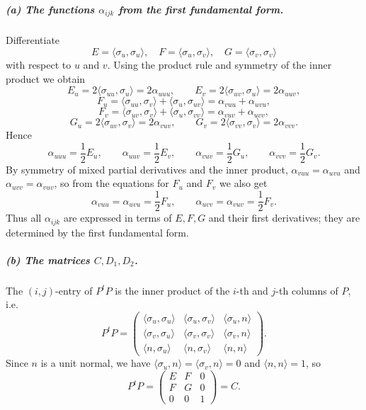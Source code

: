\documentclass[12pt,a4paper]{article}
\theoremstyle{plain}
\theoremstyle{definition}      %
\begin{document}
	\subparagraph{(a) The functions $\alpha_{ijk}$ from the first fundamental form.}
	Differentiate
	\[
	E=\langle\sigma_u,\sigma_u\rangle,\quad
	F=\langle\sigma_u,\sigma_v\rangle,\quad
	G=\langle\sigma_v,\sigma_v\rangle
	\]
	with respect to $u$ and $v$.  Using the product rule and symmetry of the inner
	product we obtain
	\[
	E_u = 2\langle\sigma_{uu},\sigma_u\rangle = 2\alpha_{uuu},\qquad
	E_v = 2\langle\sigma_{uv},\sigma_u\rangle = 2\alpha_{uuv},
	\]
	\[
	F_u = \langle\sigma_{uu},\sigma_v\rangle + \langle\sigma_u,\sigma_{uv}\rangle
	= \alpha_{vuu} + \alpha_{uvu},
	\]
	\[
	F_v = \langle\sigma_{uv},\sigma_v\rangle + \langle\sigma_u,\sigma_{vv}\rangle
	= \alpha_{vuv} + \alpha_{uvv},
	\]
	\[
	G_u = 2\langle\sigma_{uv},\sigma_v\rangle = 2\alpha_{vuv},\qquad
	G_v = 2\langle\sigma_{vv},\sigma_v\rangle = 2\alpha_{vvv}.
	\]
	Hence
	\[
	\alpha_{uuu}=\frac12E_u,\qquad \alpha_{uuv}=\frac12E_v,\qquad
	\alpha_{vuv}=\frac12G_u,\qquad \alpha_{vvv}=\frac12G_v.
	\]
	By symmetry of mixed partial derivatives and the inner product,
	\(\alpha_{vuu}=\alpha_{uvu}\) and \(\alpha_{uvv}=\alpha_{vuv}\), so from the
	equations for $F_u$ and $F_v$ we also get
	\[
	\alpha_{vuu}=\alpha_{uvu}=\frac12F_u,\qquad
	\alpha_{uvv}=\alpha_{vuv}=\frac12F_v.
	\]
	Thus all $\alpha_{ijk}$ are expressed in terms of $E,F,G$ and their first
	derivatives; they are determined by the first fundamental form.
	
	\subparagraph{(b) The matrices $C,D_1,D_2$.}
	The $(i,j)$-entry of $P^tP$ is the inner product of the $i$-th and $j$-th
	columns of $P$, i.e.
	\[
	P^tP=
	\begin{pmatrix}
		\langle\sigma_u,\sigma_u\rangle &
		\langle\sigma_u,\sigma_v\rangle &
		\langle\sigma_u,n\rangle\\[2pt]
		\langle\sigma_v,\sigma_u\rangle &
		\langle\sigma_v,\sigma_v\rangle &
		\langle\sigma_v,n\rangle\\[2pt]
		\langle n,\sigma_u\rangle &
		\langle n,\sigma_v\rangle &
		\langle n,n\rangle
	\end{pmatrix}.
	\]
	Since $n$ is a unit normal, we have
	$\langle\sigma_u,n\rangle=\langle\sigma_v,n\rangle=0$ and
	$\langle n,n\rangle=1$, so
	\[
	P^tP = \begin{pmatrix}
		E & F & 0\\[2pt]
		F & G & 0\\[2pt]
		0 & 0 & 1
	\end{pmatrix} = C.
	\]
	
\end{document}
